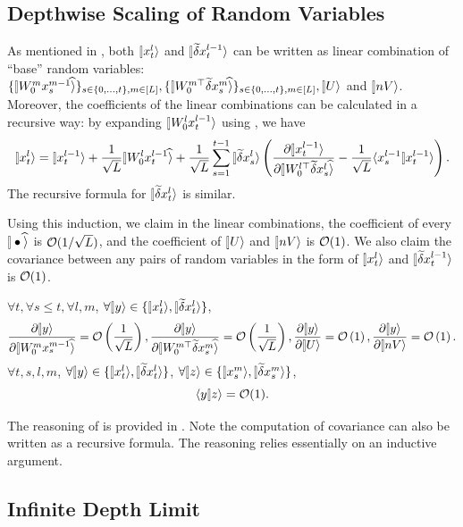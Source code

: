\documentclass{article}
\theoremstyle{plain}
\theoremstyle{definition}
\begin{document}
\subsection{Depthwise Scaling of Random Variables}

As mentioned in , both $\ket{x_t^l}$ and $\ket{\tilde\del x_t^{l-1}}$ can be written as linear combination of ``base'' random variables: $\{\hatket{W_0^m x_s^{m-1}}\}_{s\in \{0,\ldots, t\}, m\in [L]},\{\hatket{W_0^{m\top} \tilde\del x_s^{m}}\}_{s\in \{0,\ldots, t\}, m\in [L]}, \ket{U}$ and $\ket{nV}$. Moreover, the coefficients of the linear combinations can be calculated in a recursive way: 
by expanding $\ket{W_0^l x_t^{l-1}}$ using , we have 
\[\ket{x_t^l} = \ket{x_t^{l-1}} + \frac1{\sqrt L} \hatket{W_0^l x_t^{l-1}} + \frac1{\sqrt L} \sum_{s=1}^{t-1} \ket{\tilde\del x_s^{l}} \left(\frac{\partial \ket{x_t^{l-1}}}{\partial \hatket{W_0^{l\top} \tilde\del x_s^{l}}} - \frac1{\sqrt L} \braket{x_s^{l-1}}{x_t^{l-1}} \right).\]
The recursive formula for $\ket{\tilde\del x_t^l}$ is similar. 

Using this induction, we claim in the linear combinations, the coefficient of every $\hatket{\bullet}$ is $\mathcal{O}(1/\sqrt{L})$, and the coefficient of $\ket{U}$ and $\ket{nV}$ is $\mathcal{O}(1)$. We also claim the covariance between any pairs of random variables in the form of $\ket{x_t^l}$ and $\ket{\tilde\del x_t^{l-1}}$ is $\mathcal{O}(1)$. 
\begin{prop}\label{prop:derivatives}
     $\forall t, \forall s \leq t, \forall l,m$, $\forall \ket{y}\in \{\ket{x_t^l}, \ket{\tilde\del x_t^l}\}$, 
     \[\frac{\partial \ket{y}}{\partial \hatket{W_0^mx_s^{m-1}}} = \cO\left(\frac1{\sqrt L}\right),
     \frac{\partial \ket{y}}{\partial \hatket{W_0^{m\top}\tilde\del x_s^m}} = \cO\left(\frac1{\sqrt L}\right),
     \frac{\partial \ket{y}}{\partial \ket{U}} = \cO\left(1\right),
     \frac{\partial \ket{y}}{\partial \ket{nV}} = \cO\left(1\right).\]
     $\forall t, s,l,m$, $\forall \ket{y}\in \{\ket{x_t^l}, \ket{\tilde\del x_t^l}\}$, $\forall \ket{z}\in \{\ket{x_s^m}, \ket{\tilde\del x_s^m}\}$,
     \[\braket y z=\cO(1).\]
\end{prop}

The reasoning of  is provided in . Note the computation of covariance can also be written as a recursive formula. The reasoning relies essentially on an inductive argument. 

\subsection{Infinite Depth Limit}
\end{document}
